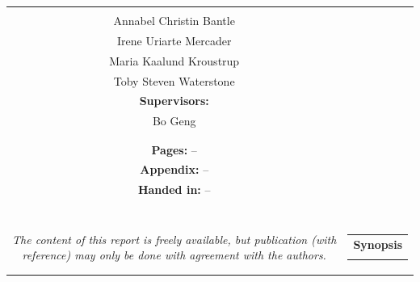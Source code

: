 \begin{titlepage}
\begin{nopagebreak}
{\begin{tabular}{cc}
{{\textbf{Participants:}\\
Annabel Christin Bantle \\
Irene Uriarte Mercader \\
Maria Kaalund Kroustrup \\
Toby Steven Waterstone \\


\textbf{Supervisors:}\\
Bo Geng

}\\
\\
\\
\textbf{Pages:} --\\
\textbf{Appendix:} -- \\
\textbf{Handed in:} --\\
\\
\\
\\
\\
\\
\textit{The content of this report is freely available, but publication (with reference) may only be done with
	agreement with the authors.}
\vfill } &
\parbox{7cm}{
  \vspace{.15cm}
  \hfill
  \begin{tabular}{l}
  {\textbf{Synopsis}}\bigskip \\
  \fbox{
    \parbox{7.5cm}{\bigskip
     {\vfill{\small 
     \bigskip}}
     }}
   \end{tabular}}
\end{tabular}} %


\end{nopagebreak}
\end{titlepage}
%